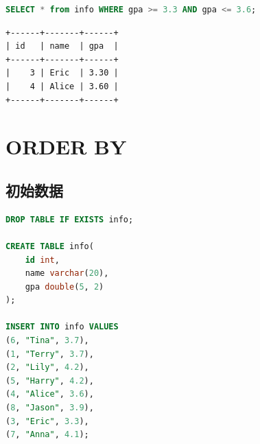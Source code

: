 \documentclass[12pt, openany, oneside]{book}
\begin{document}
\begin{table}[H]
    \centering
    \caption{运算符}
\end{table}


\begin{lstlisting}[language=SQL]
SELECT * from info WHERE gpa >= 3.3 AND gpa <= 3.6;
\end{lstlisting}

\begin{tcolorbox}
    \begin{verbatim}
+------+-------+------+
| id   | name  | gpa  |
+------+-------+------+
|    3 | Eric  | 3.30 |
|    4 | Alice | 3.60 |
+------+-------+------+
    \end{verbatim}
\end{tcolorbox}

\newpage

\chapter{ORDER BY}

\section{初始数据}


\begin{lstlisting}[language=SQL]
DROP TABLE IF EXISTS info;

CREATE TABLE info(
    id int,
    name varchar(20),
    gpa double(5, 2)
);

INSERT INTO info VALUES
(6, "Tina", 3.7),
(1, "Terry", 3.7),
(2, "Lily", 4.2),
(5, "Harry", 4.2),
(4, "Alice", 3.6),
(8, "Jason", 3.9),
(3, "Eric", 3.3),
(7, "Anna", 4.1);
\end{lstlisting}
\end{document}
